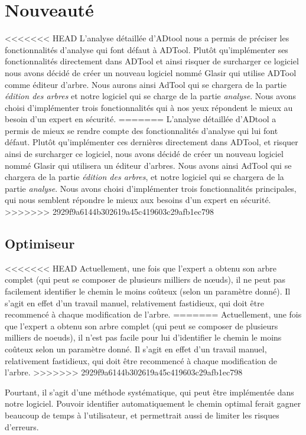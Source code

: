 \section{Nouveauté}
	
<<<<<<< HEAD
	L'analyse détaillée d'ADtool nous a permis de préciser les fonctionnalités d'analyse qui font défaut à ADTool. Plutôt qu'implémenter ses fonctionnalités directement dans ADTool et ainsi risquer de surcharger ce logiciel nous avons décidé de créer un nouveau logiciel nommé Glasir qui utilise ADTool comme éditeur d'arbre. Nous aurons ainsi AdTool qui se chargera de la partie \textit{édition des arbres} et notre logiciel qui se charge de la partie \textit{analyse}. Nous avons choisi d'implémenter trois fonctionnalités qui à nos yeux répondent le mieux au besoin d'un expert en sécurité.
=======
	L'analyse détaillée d'ADtool a permis de mieux se rendre compte des fonctionnalités d'analyse qui lui font défaut. Plutôt qu'implémenter ces dernières directement dans ADTool, et risquer ainsi de surcharger ce logiciel, nous avons décidé de créer un nouveau logiciel nommé Glasir qui utilisera un éditeur d'arbres. Nous avons ainsi AdTool qui se chargera de la partie \textit{édition des arbres}, et notre logiciel qui se chargera de la partie \textit{analyse}. Nous avons choisi d'implémenter trois fonctionnalités principales, qui nous semblent répondre le mieux aux besoins d'un expert en sécurité.
>>>>>>> 2929f9a6144b302619a45c419603c29afb1ec798

	\subsection{Optimiseur}
		
<<<<<<< HEAD
		Actuellement, une fois que l'expert a obtenu son arbre complet (qui peut se composer de plusieurs milliers de nœuds), il ne peut pas facilement identifier le chemin le moins coûteux (selon un paramètre donné).
		Il s'agit en effet d'un travail manuel, relativement fastidieux, qui doit être recommencé à chaque modification de l'arbre.
=======
		Actuellement, une fois que l'expert a obtenu son arbre complet (qui peut se composer de plusieurs milliers de noeuds), il n'est pas facile pour lui d'identifier le chemin le moins coûteux selon un paramètre donné. Il s'agit en effet d'un travail manuel, relativement fastidieux, qui doit être recommencé à chaque modification de l'arbre.
>>>>>>> 2929f9a6144b302619a45c419603c29afb1ec798
		
		Pourtant, il s'agit d'une méthode systématique, qui peut être implémentée dans notre logiciel. Pouvoir identifier automatiquement le chemin optimal ferait gagner beaucoup de temps à l'utilisateur, et permettrait aussi de limiter les risques d'erreurs.
		

